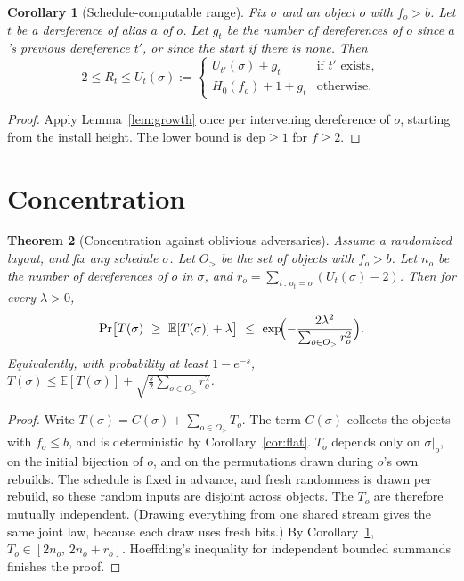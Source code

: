 \documentclass[11pt]{article}
\newtheorem{theorem}{Theorem}
\newtheorem{corollary}[theorem]{Corollary}
\theoremstyle{definition}
\newcommand{\E}{\mathbb{E}}
\newcommand{\dep}{\mathrm{dep}}
\begin{document}
\begin{corollary}[Schedule-computable range]\label{cor:range}
Fix $\sigma$ and an object $o$ with $f_o>b$. Let $t$ be a dereference of alias
$a$ of $o$. Let $g_t$ be the number of dereferences of $o$ since $a$'s previous
dereference $t'$, or since the start if there is none. Then
\[
2\le R_t\le U_t(\sigma):=\begin{cases}U_{t'}(\sigma)+g_t & \text{if } t' \text{ exists},\\
H_0(f_o)+1+g_t & \text{otherwise.}\end{cases}
\]
\end{corollary}
\begin{proof}
Apply Lemma~\ref{lem:growth} once per intervening dereference of $o$, starting
from the install height. The lower bound is $\dep\ge 1$ for $f\ge 2$.
\end{proof}

\section{Concentration}\label{sec:concentration}

\begin{theorem}[Concentration against oblivious adversaries]\label{thm:main}
Assume a randomized layout, and fix any schedule $\sigma$. Let $O_{>}$ be the
set of objects with $f_o>b$. Let $n_o$ be the number of dereferences of $o$ in
$\sigma$, and $r_o=\sum_{t\,:\,o_t=o}(U_t(\sigma)-2)$. Then for every
$\lambda>0$,
\[
\Pr\bigl[T(\sigma)\ \ge\ \E[T(\sigma)]+\lambda\bigr]\ \le\
\exp\!\Bigl(-\frac{2\lambda^2}{\sum_{o\in O_>} r_o^2}\Bigr).
\]
Equivalently, with probability at least $1-e^{-s}$,
$T(\sigma)\le \E[T(\sigma)]+\sqrt{\tfrac{s}{2}\sum_{o\in O_>} r_o^2}$.
\end{theorem}
\begin{proof}
Write $T(\sigma)=C(\sigma)+\sum_{o\in O_>}T_o$. The term $C(\sigma)$ collects
the objects with $f_o\le b$, and is deterministic by
Corollary~\ref{cor:flat}. $T_o$ depends only on $\sigma|_o$, on the initial
bijection of $o$, and on the permutations drawn during $o$'s own rebuilds. The
schedule is fixed in advance, and fresh randomness is drawn per rebuild, so
these random inputs are disjoint across objects. The $T_o$ are therefore
mutually independent. (Drawing everything from one shared stream gives the
same joint law, because each draw uses fresh bits.) By
Corollary~\ref{cor:range}, $T_o\in[2n_o,\,2n_o+r_o]$. Hoeffding's inequality
for independent bounded summands finishes the proof.
\end{proof}
\end{document}
